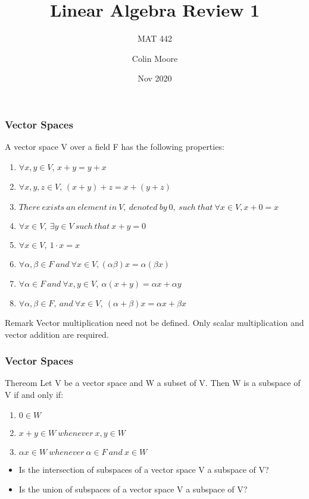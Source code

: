 \documentclass[11pt]{beamer}
\begin{document}
	\author{Colin Moore}
	\title{Linear Algebra Review 1}
	\subtitle{MAT 442}
	\date{Nov 2020}
	\subject{MAT 442}
	\begin{frame}[plain]
		\maketitle
	\end{frame}

\begin{frame}
	\frametitle{Vector Spaces}
	A vector space V over a field F has the following properties:
	\begin{enumerate}
		[default]
		\item $\forall x, y \in V$, $x + y = y + x$
		\item $\forall x, y, z \in V$, $(x + y) + z = x + (y + z)$
		\item $There \ exists\ an\ element\ in\ V,\ denoted\ by\ 0,\ such\ that\ \forall x \in V, x + 0 = x$
		\item $\forall x \in V, \: \exists y \in V\ such\ that\ x + y = 0$
		\item $\forall x \in V, \: 1\cdot x = x$
		\item $\forall \alpha, \beta \in F\ and\ \forall x \in V, (\alpha\beta)x = \alpha(\beta x)$
		\item $\forall \alpha \in F\ and\ \forall x, y \in V,\ 
				\alpha(x+y) = \alpha x + \alpha y$
		\item $\forall \alpha, \beta \in F,\ and\ \forall x \in V,\ 
				(\alpha + \beta)x = \alpha x + \beta x$
	\end{enumerate}

	\begin{block}{Remark}
		Vector multiplication need not be defined. Only \alert{scalar} multiplication and vector addition are required.
	\end{block}
\end{frame}

\begin{frame}
	\frametitle{Vector Spaces}
	\begin{block}{Thereom}
		Let V be a vector space and W a subset of V. Then W is a subspace of V if and only if:
		\begin{enumerate}
			\setbeamertemplate{enumerate items}[default]
			\item $0 \in W$
			\item $x + y \in W\ whenever \ x, y \in W$
			\item $\alpha x \in W\ whenever\ \alpha \in F\ and\  x \in W$
		\end{enumerate}
	\end{block}

	\begin{itemize}
		\item Is the intersection of subspaces of a vector space V a subspace of V?
		\item Is the union of subspaces of a vector space V a subspace of V?
	\end{itemize}
\end{frame}
\end{document}
